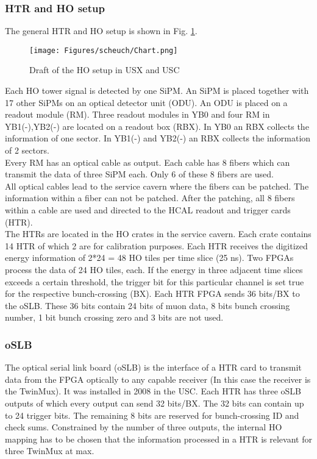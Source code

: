 \subsubsection{HTR and HO setup}
The general HTR and HO setup is shown in Fig. \ref{HOPlan}.
\begin{figure}[htbp]
\centering
\begin{minipage}[t]{0.95\textwidth}
\texttt{[image: Figures/scheuch/Chart.png]}
\caption{Draft of the HO setup in USX and USC}
\label{HOPlan}
\end{minipage}
\end{figure}
Each HO tower signal is detected by one SiPM. An SiPM is placed together with 17 other SiPMs on an optical detector unit (ODU). An ODU is placed on a readout module (RM). Three readout modules in YB0 and four RM in YB1(-),YB2(-) are located on a readout box (RBX). In YB0 an RBX collects the information of one sector. In YB1(-) and YB2(-) an RBX collects the information of 2 sectors.\\
Every RM has an optical cable as output. Each cable has 8 fibers which can transmit the data of three SiPM each. Only 6 of these 8 fibers are used.\\
All optical cables lead to the service cavern where the fibers can be patched. The information within a fiber can not be patched. After the patching, all 8 fibers within a cable are used and directed to the HCAL readout and trigger cards (HTR).\\
The HTRs are located in the HO crates in the service cavern. Each crate contains 14 HTR of which 2 are for calibration purposes. Each HTR receives the digitized energy information of 2*24 = 48 HO tiles per time slice (25 ns). Two FPGAs process the data of 24 HO tiles, each. If the energy in three adjacent time slices exceeds a certain threshold, the trigger bit for this particular channel is set true for the respective bunch-crossing (BX).
Each HTR FPGA sends 36 bits/BX to the oSLB. These 36 bits contain 24 bits of muon data, 8 bits bunch crossing number, 1 bit bunch crossing zero and 3 bits are not used.
\subsubsection{oSLB}
The optical serial link board (oSLB) is the interface of a HTR card to transmit data from the FPGA optically to any capable receiver (In this case the receiver is the TwinMux). It was installed in 2008 in the USC. Each HTR has three oSLB outputs of which every output can send 32 bits/BX. The 32 bits can contain up to 24 trigger bits. The remaining 8 bits are reserved for bunch-crossing ID and check sums. Constrained by the number of three outputs, the internal HO mapping has to be chosen that the information processed in a HTR is relevant for three TwinMux at max.
